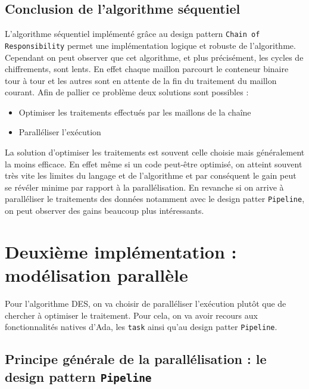 \documentclass[a4paper]{article}
\begin{document}
\subsection{Conclusion de l'algorithme séquentiel}
L'algorithme séquentiel implémenté grâce au design pattern \texttt{Chain of Responsibility} permet une implémentation logique et robuste de l'algorithme. Cependant on peut observer que cet algorithme, et plus précisément, les cycles de chiffrements, sont lents. En effet chaque maillon parcourt le conteneur binaire tour à tour et les autres sont en attente de la fin du traitement du maillon courant.
\smallbreak
Afin de pallier ce problème deux solutions sont possibles :
\begin{itemize}
\item Optimiser les traitements effectués par les maillons de la chaîne
\item Paralléliser l'exécution
\end{itemize}
La solution d'optimiser les traitements est souvent celle choisie mais généralement la moins efficace. En effet même si un code peut-être optimisé, on atteint souvent très vite les limites du langage et de l'algorithme et par conséquent le gain peut se révéler minime par rapport à la parallélisation.
\smallbreak
En revanche si on arrive à paralléliser le traitements des données notamment avec le design patter \texttt{Pipeline}, on peut observer des gains beaucoup plus intéressants.

\section{Deuxième implémentation : modélisation parallèle}

Pour l'algorithme DES, on va choisir de paralléliser l'exécution plutôt que de chercher à optimiser le traitement. Pour cela, on va avoir recours aux fonctionnalités natives d'Ada, les \texttt{task} ainsi qu'au design patter \texttt{Pipeline}.

\subsection{Principe générale de la parallélisation : le design pattern \texttt{Pipeline}}
\end{document}
